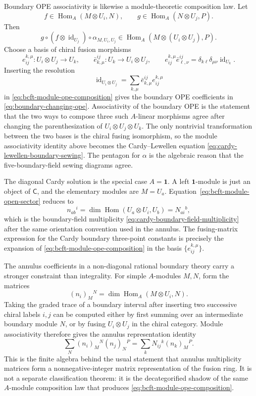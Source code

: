 Boundary OPE associativity is likewise a module-theoretic composition law.
Let
\[
  f\in\operatorname{Hom}_{A}(M\otimes U_i,N),
  \qquad
  g\in\operatorname{Hom}_{A}(N\otimes U_j,P).
\]
Then
\begin{equation}
  g\circ(f\otimes\operatorname{id}_{U_j})\circ\alpha_{M,U_i,U_j}
  \in
  \operatorname{Hom}_{A}(M\otimes(U_i\otimes U_j),P).
  \label{eq:bcft-module-ope-composition}
\end{equation}
Choose a basis of chiral fusion morphisms
\[
  e^{k,\mu}_{ij}:U_i\otimes U_j\to U_k,
  \qquad
  \bar e^{ij}_{k,\mu}:U_k\to U_i\otimes U_j,
  \qquad
  e^{k,\mu}_{ij}\bar e^{ij}_{\ell,\nu}
  =
  \delta_{k\ell}\delta_{\mu\nu}\operatorname{id}_{U_k}.
\]
Inserting the resolution
\[
  \operatorname{id}_{U_i\otimes U_j}
  =
  \sum_{k,\mu}\bar e^{ij}_{k,\mu}e^{k,\mu}_{ij}
\]
in \eqref{eq:bcft-module-ope-composition} gives the boundary OPE
coefficients in \eqref{eq:boundary-changing-ope}.  Associativity of the
boundary OPE is the statement that the two ways to compose three such
\(A\)-linear morphisms agree after changing the parenthesization of
\(U_i\otimes U_j\otimes U_k\).  The only nontrivial transformation between
the two bases is the chiral fusing isomorphism, so the module associativity
identity above becomes the Cardy--Lewellen equation
\eqref{eq:cardy-lewellen-boundary-sewing}.  The pentagon for \(\alpha\) is
the algebraic reason that the five-boundary-field sewing diagrams agree.

The diagonal Cardy solution is the special case \(A=\mathbf 1\).  A left
\(\mathbf 1\)-module is just an object of \(\mathsf C\), and the elementary
modules are \(M=U_a\).  Equation~\eqref{eq:bcft-module-open-sector} reduces
to
\[
  n_{ab}{}^i
  =
  \dim\operatorname{Hom}(U_a\otimes U_i,U_b)
  =
  N_{ai}{}^b ,
\]
which is the boundary-field multiplicity
\eqref{eq:cardy-boundary-field-multiplicity} after the same orientation
convention used in the annulus.  The fusing-matrix expression for the Cardy
boundary three-point constants is precisely the expansion of
\eqref{eq:bcft-module-ope-composition} in the basis
\(\{e_{ij}^{k,\mu}\}\).

The annulus coefficients in a non-diagonal rational boundary theory carry a
stronger constraint than integrality.  For simple \(A\)-modules \(M,N\), form
the matrices
\[
  (n_i)_M{}^N
  =
  \dim\operatorname{Hom}_{A}(M\otimes U_i,N).
\]
Taking the graded trace of a boundary interval after inserting two successive
chiral labels \(i,j\) can be computed either by first summing over an
intermediate boundary module \(N\), or by fusing \(U_i\otimes U_j\) in the
chiral category.  Module associativity therefore gives the annulus
representation identity
\begin{equation}
  \sum_N (n_i)_M{}^N (n_j)_N{}^P
  =
  \sum_k N_{ij}{}^k (n_k)_M{}^P .
  \label{eq:bcft-annulus-nimrep-identity}
\end{equation}
This is the finite algebra behind the usual statement that annulus
multiplicity matrices form a nonnegative-integer matrix representation of the
fusion ring.  It is not a separate classification theorem: it is the
decategorified shadow of the same \(A\)-module composition law that produces
\eqref{eq:bcft-module-ope-composition}.

